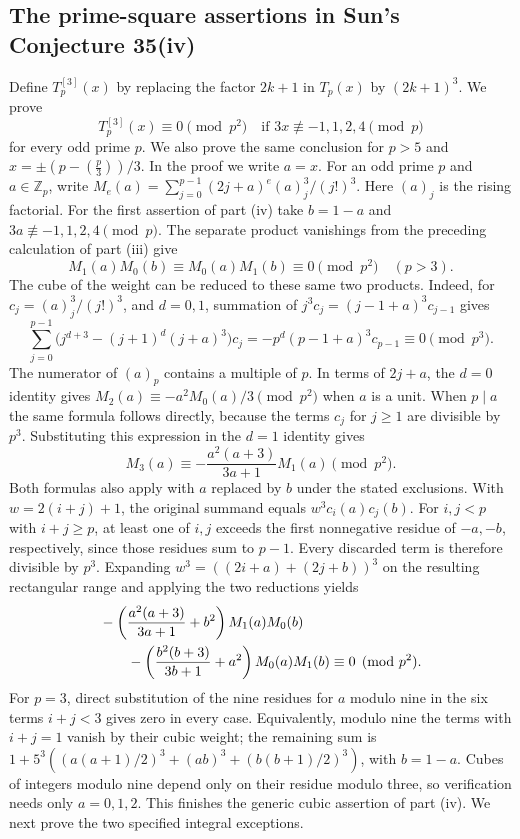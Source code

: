 \documentclass[11pt,a4paper]{article}
\theoremstyle{definition}\newtheorem{problem}[theorem]{Auxiliary problem}
\theoremstyle{remark}\newtheorem*{remark}{Remark}
\begin{document}
\subsection{The prime-square assertions in Sun's Conjecture 35(iv)}
Define $T_p^{[3]}(x)$ by replacing the factor $2k+1$ in $T_p(x)$ by $(2k+1)^3$. We prove
\[
 T_p^{[3]}(x)\equiv0\pmod{p^2}
 \quad\text{if }3x\not\equiv -1,1,2,4\pmod p
\]
for every odd prime $p$. We also prove the same conclusion for $p>5$ and $x=\pm(p-(\frac p3))/3$. In the proof we write $a=x$.
For an odd prime $p$ and $a\in\mathbb Z_p$, write
$M_e(a)=\sum_{j=0}^{p-1}(2j+a)^e(a)_j^3/(j!)^3$.
Here $(a)_j$ is the rising factorial.
For the first assertion of part (iv) take $b=1-a$ and
$3a\not\equiv-1,1,2,4\pmod p$.
The separate product vanishings from the preceding calculation of part (iii) give
\[
 M_1(a)M_0(b)\equiv M_0(a)M_1(b)\equiv0\pmod{p^2}\quad(p>3).
\]
The cube of the weight can be reduced to these same two products.
Indeed, for $c_j=(a)_j^3/(j!)^3$, and $d=0,1$, summation of
$j^3 c_j=(j-1+a)^3c_{j-1}$ gives
\[
 \sum_{j=0}^{p-1}\big(j^{d+3}-(j+1)^d(j+a)^3\big)c_j
 =-p^d(p-1+a)^3c_{p-1}\equiv0\pmod{p^3}.
\]
The numerator of $(a)_p$ contains a multiple of $p$. In terms of $2j+a$,
the $d=0$ identity gives
$M_2(a)\equiv-a^2M_0(a)/3\pmod{p^2}$ when $a$ is a unit.
When $p\mid a$ the same formula follows directly, because the terms
$c_j$ for $j\ge1$ are divisible by $p^3$. Substituting this expression
in the $d=1$ identity gives
\[
 M_3(a)\equiv-\frac{a^2(a+3)}{3a+1}M_1(a)\pmod{p^2}.
\]
Both formulas also apply with $a$ replaced by $b$ under the stated exclusions.
With $w=2(i+j)+1$, the original summand equals $w^3c_i(a)c_j(b)$.
For $i,j<p$ with $i+j\ge p$, at least one of $i,j$ exceeds the first
nonnegative residue of $-a,-b$, respectively, since those residues sum to
$p-1$. Every discarded term is therefore divisible by $p^3$.
Expanding $w^3=((2i+a)+(2j+b))^3$ on the resulting rectangular range
and applying the two reductions yields
\begin{align*}
 &-\left(\frac{a^2(a+3)}{3a+1}+b^2\right)M_1(a)M_0(b)\\
 &\hspace{7mm}-\left(\frac{b^2(b+3)}{3b+1}+a^2\right)M_0(a)M_1(b)
 \equiv0\pmod{p^2}.
\end{align*}
For $p=3$, direct substitution of the nine residues for $a$ modulo nine in
the six terms $i+j<3$ gives zero in every case. Equivalently, modulo nine
the terms with $i+j=1$ vanish by their cubic weight; the remaining sum is
$1+5^3((a(a+1)/2)^3+(ab)^3+(b(b+1)/2)^3)$, with $b=1-a$.
Cubes of integers modulo nine depend only on their residue modulo three,
so verification needs only $a=0,1,2$. This finishes the generic cubic
assertion of part (iv). We next prove the two specified integral exceptions.
\end{document}
